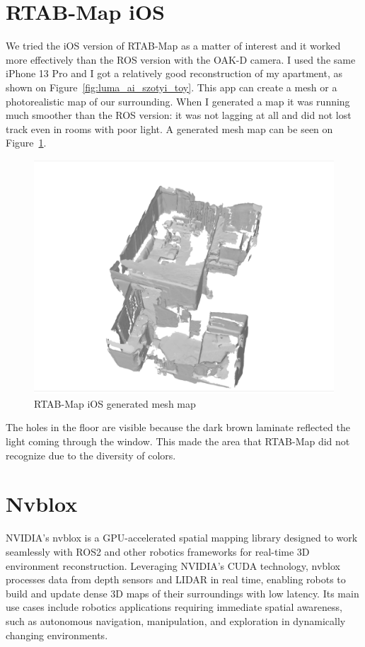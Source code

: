 \FloatBarrier
\section{RTAB-Map iOS}

We tried the iOS version of RTAB-Map as a matter of interest and it worked more effectively than the ROS version with the OAK-D camera. I used the same iPhone 13 Pro and I got a relatively good reconstruction of my apartment, as shown on Figure~\ref{fig:luma_ai_szotyi_toy}. This app can create a mesh or a photorealistic map of our surrounding. When I generated a map it was running much smoother than the ROS version: it was not lagging at all and did not lost track even in rooms with poor light. A generated mesh map can be seen on Figure~\ref{fig:rtabmap_ios}.

\begin{figure}[htbp]
	\centering
	\includegraphics[width=150mm, keepaspectratio]{figures/rtabmap_ios.png}
	\caption{RTAB-Map iOS generated mesh map}
	\label{fig:rtabmap_ios}
\end{figure}

The holes in the floor are visible because the dark brown laminate reflected the light coming through the window. This made the area that RTAB-Map did not recognize due to the diversity of colors.

\section{Nvblox}

NVIDIA’s nvblox is a GPU-accelerated spatial mapping library designed to work seamlessly with ROS2 and other robotics frameworks for real-time 3D environment reconstruction. Leveraging NVIDIA’s CUDA technology, nvblox processes data from depth sensors and LIDAR in real time, enabling robots to build and update dense 3D maps of their surroundings with low latency. Its main use cases include robotics applications requiring immediate spatial awareness, such as autonomous navigation, manipulation, and exploration in dynamically changing environments.

